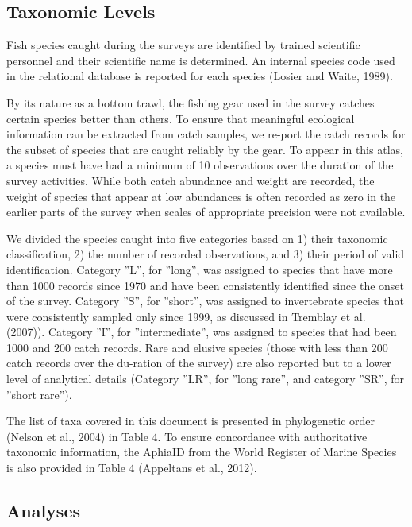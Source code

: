 \documentclass[12pt]{article}\usepackage[]{graphicx}\usepackage[]{color}
\begin{document}
\subsection{Taxonomic Levels}\label{taxonomic-levels}

Fish species caught during the surveys are identified by trained scientific personnel and their scientific name is determined. An internal species code used in the relational database is reported for each species (Losier and Waite, 1989).

By its nature as a bottom trawl, the fishing gear used in the survey catches certain species better than others. To ensure that meaningful ecological information can be extracted from catch samples, we re-port the catch records for the subset of species that are caught reliably by the gear. To appear in this atlas, a species must have had a minimum of 10 observations over the duration of the survey activities. While both catch abundance and weight are recorded, the weight of species that appear at low abundances is often recorded as zero in the earlier parts of the survey when scales of appropriate precision were not available.

We divided the species caught into five categories based on 1) their taxonomic classification, 2) the number of recorded observations, and 3) their period of valid identification. Category ''L'', for ''long'', was assigned to species that have more than 1000 records since 1970 and have been consistently identified since the onset of the survey. Category ''S'', for ''short'', was assigned to invertebrate species that were consistently sampled only since 1999, as discussed in Tremblay et al. (2007)). Category ''I'', for ''intermediate'', was assigned to species that had been 1000 and 200 catch records. Rare and elusive species (those with less than 200 catch records over the du-ration of the survey) are also reported but to a lower level of analytical details (Category ''LR'', for ''long rare'', and category ''SR'', for ''short rare'').

The list of taxa covered in this document is presented in phylogenetic order (Nelson et al., 2004) in Table 4. To ensure concordance with authoritative taxonomic information, the AphiaID from the World Register of Marine Species is also provided in Table 4 (Appeltans et al., 2012).

\subsection{Analyses}\label{analyses}
\end{document}
